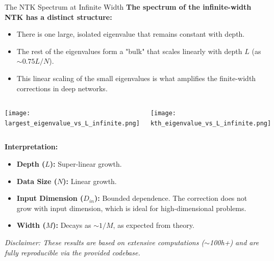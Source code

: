 \documentclass{beamer}
\begin{document}
\begin{frame}{The NTK Spectrum at Infinite Width}
\textbf{The spectrum of the infinite-width NTK has a distinct structure:}
\begin{itemize}
    \item There is one large, isolated eigenvalue that remains constant with depth.
    \item The rest of the eigenvalues form a "bulk" that scales linearly with depth $L$ (as $\sim 0.75 L/N$).
    \item This linear scaling of the small eigenvalues is what amplifies the finite-width corrections in deep networks.
\end{itemize}

\begin{columns}[T] %
    \texttt{[image: largest\_eigenvalue\_vs\_L\_infinite.png]}

    \texttt{[image: kth\_eigenvalue\_vs\_L\_infinite.png]}
\end{columns}

\textbf{Interpretation:}
\begin{itemize}
    \item \textbf{Depth ($L$):} Super-linear growth.
    \item \textbf{Data Size ($N$):} Linear growth.
    \item \textbf{Input Dimension ($D_{in}$):} Bounded dependence. The correction does not grow with input dimension, which is ideal for high-dimensional problems.
    \item \textbf{Width ($M$):} Decays as $\sim 1/M$, as expected from theory.
\end{itemize}

\vfill
\tiny{\textit{Disclaimer: These results are based on extensive computations ($\sim$100h+) and are fully reproducible via the provided codebase.}}

\end{frame}
\end{document}
